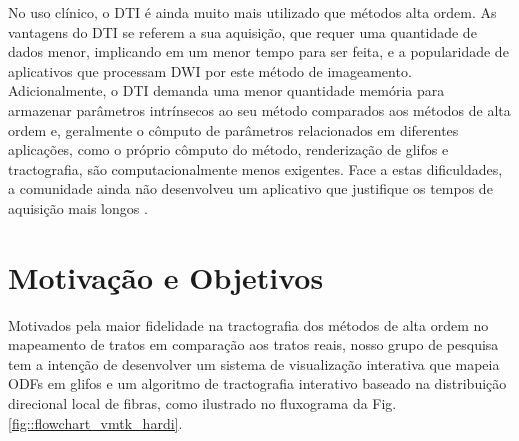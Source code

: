 \documentclass[
    12pt,                %
    oneside,            %
    a4paper,            %
    english,            %
    french,                %
    spanish,            %
    brazil                %
    ]{abntex2}
\begin{document}
No uso clínico, o DTI é ainda muito mais utilizado que métodos alta ordem. As vantagens do DTI se referem a sua aquisição, que requer uma quantidade de dados menor, implicando em um menor tempo para ser feita, e a popularidade de aplicativos que processam DWI por este método de imageamento. Adicionalmente, o DTI demanda uma menor quantidade memória para armazenar parâmetros intrínsecos ao seu método comparados aos métodos de alta ordem e, geralmente o cômputo de parâmetros relacionados em diferentes aplicações, como o próprio cômputo do método, renderização de glifos e tractografia, são computacionalmente menos exigentes. Face a estas dificuldades, a comunidade ainda não desenvolveu  um aplicativo que justifique os tempos de aquisição mais longos \cite{descoteaux2015}.








\section{Motivação e Objetivos}
\label{ssec:motivation}

Motivados pela maior fidelidade na tractografia dos métodos de alta ordem no mapeamento de tratos em comparação aos tratos reais, nosso grupo de pesquisa tem a intenção de desenvolver um sistema de visualização interativa que mapeia ODFs em glifos e um algoritmo de tractografia interativo baseado na distribuição direcional local de fibras, como ilustrado no fluxograma da Fig. \ref{fig::flowchart_vmtk_hardi}.
\end{document}
